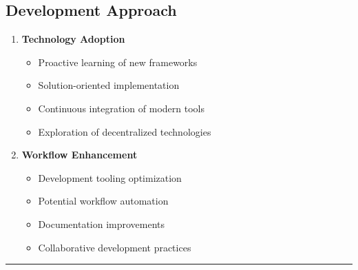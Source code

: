\documentclass[10pt,a4paper]{article}
\begin{document}
\begin{multicols}{2}
\subsection*{Development Approach}
\begin{enumerate}\small
  \item \textbf{Technology Adoption}
    \begin{itemize}
      \item Proactive learning of new frameworks
      \item Solution-oriented implementation
      \item Continuous integration of modern tools
      \item Exploration of decentralized technologies
    \end{itemize}
  
  \item \textbf{Workflow Enhancement}
    \begin{itemize}
      \item Development tooling optimization
      \item Potential workflow automation
      \item Documentation improvements
      \item Collaborative development practices
    \end{itemize}
\end{enumerate}
\end{multicols}

\noindent\rule{\textwidth}{0.4pt}
\end{document}

